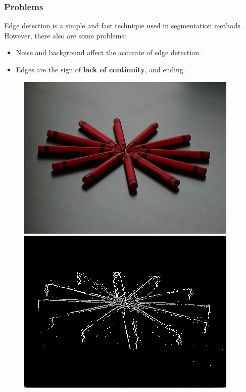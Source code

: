 \documentclass[notheorems,serif,table,compress]{beamer}  %
\begin{document}
\begin{frame}
\frametitle{Problems}
Edge detection is a simple and fast technique used in segmentation methods. However, there also are some problems:
    \begin{itemize}
        \item Noise and background affect the accurate of edge detection.
        \item {\color{blue}Edges are the sign of {\textbf{lack of continuity}}, and ending.}
    \end{itemize}
    \begin{figure}
        \begin{minipage}[t]{0.4\linewidth}
        \centering
        \includegraphics[width=1\linewidth]{0_0_284.jpg} 
        \end{minipage}
        \begin{minipage}[t]{0.4\linewidth}
        \centering
        \includegraphics[width=1\linewidth]{noise.png} 
        \end{minipage}
    \end{figure}
\end{frame}
\end{document}
